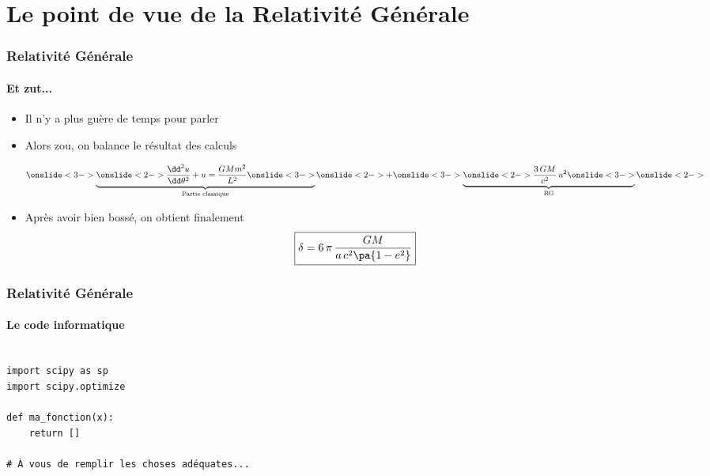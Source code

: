 \section{Le point de vue de la Relativité Générale}


\begin{frame}
\frametitle{Relativité Générale}
\framesubtitle{Et zut...}

\begin{itemize}
	\item	<1->	Il n'y a plus guère de temps pour parler
	\item	<2->	Alors zou, on balance le résultat des calculs

$$
    \onslide<3->
    \underbrace{
    \onslide<2->    
    \frac{\dd^2 u}{\dd \theta^2} + u 
        = 
        \frac{G M m^2}{L^2} 
    \onslide<3->
    }_{\text{Partie classique}}
    \onslide<2->
    + 
    \onslide<3->
    \underbrace{
    \onslide<2->    
    \frac{3\, G M}{c^2}\, u^2
    \onslide<3->
    }_{\text{RG}}
    \onslide<2->
$$

	\item	<4->	Après avoir bien bossé, on obtient finalement
$$
	\boxed{
		\delta = 6\, \pi \, \frac{G M}{a\, c^2\pa{1-e^2}}
			}
$$

\end{itemize}

\end{frame}



\begin{frame}[fragile]
\frametitle{Relativité Générale}
\framesubtitle{Le code informatique}

\begin{code}
\begin{verbatim}

import scipy as sp
import scipy.optimize

def ma_fonction(x):
    return []

# À vous de remplir les choses adéquates...

\end{verbatim}
\end{code}
\end{frame}
